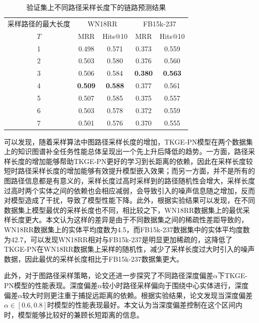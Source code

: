 \begin{table}[htbp]
    \begin{center}
        \caption{验证集上不同路径采样长度下的链路预测结果}
        \renewcommand{\arraystretch}{1.5}
        \begin{tabular}{*{5}{c}}
            \toprule
            采样路径的最大长度& \multicolumn{2}{c}{WN18RR} & \multicolumn{2}{c}{FB15k-237}\\
            \cmidrule(lr){2-3}\cmidrule(lr){4-5}
            $T$&MRR&Hits@10&MRR&Hits@10\\
            \midrule
            1	&0.498&0.571&0.373&0.559\\
            2	&0.503&0.580&0.376&0.560\\
            3	&0.506&0.584&\textbf{0.380}&\textbf{0.563}\\
            4	&\textbf{0.509}&\textbf{0.588}&0.377&0.561\\
            5	&0.507&0.585&0.375&0.557\\
            6	&0.503&0.578&0.372&0.559\\
            7	&0.501&0.576&0.370&0.555\\
            \bottomrule
        \end{tabular}
        \label{length_tab}
    \end{center}
\end{table}

可以发现，随着采样算法中图路径采样长度的增加，TKGE-PN模型在两个数据集上的知识图谱补全任务性能总体呈现出一个先上升后降低的趋势。一方面，路径采样长度的增加能够帮助TKGE-PN更好的学习到长距离的依赖，因此在采样长度较短时路径采样长度的增加能够有效提升模型嵌入效果；而另一方面，并不是所有的图路径信息都是有意义的，采样长度过高时采样到的路径随机性会增大，采样长度过高时两个实体之间的依赖也会相应减弱，会导致引入的噪声信息随之增加，反而对模型造成了干扰，导致了模型性能下降。此外，根据实验结果可以发现，在不同数据集上模型最优的采样长度也不同，相比较之下，WN18RR数据集上的最优采样长度更大。本文认为这样的差异是由于不同数据集之间的稀疏性差距导致的，WN18RR数据集上的实体平均度数为4.5，而FB15k-237数据集中的实体平均度数为42.7，可以发现WN18RR相对与FB15k-237是明显更加稀疏的，这降低了TKGE-PN在WN18RR数据集上采样的随机性，减少了采样长度过大时引入的噪声数据，因此最优的采样长度相比于FB15k-237数据集更大。  

此外，对于图路径采样策略，论文还进一步探究了不同路径深度偏差$\alpha$下TKGE-PN模型的性能表现。深度偏差$\alpha$较小时路径采样偏向于围绕中心实体进行，深度偏差$\alpha$较大时则更注重于捕捉远距离的依赖。根据实验结果，论文发现当深度偏差$\alpha\in\left[0.6,0.8\right] $时模型的性能表现最好。本文认为当深度偏差控制在这个区间内时，模型能够比较好的兼顾长短距离的信息。


